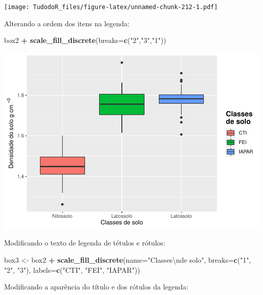 \documentclass[
]{book}
\newenvironment{Shaded}{\begin{snugshade}}{\end{snugshade}}
\newcommand{\CharTok}[1]{\textcolor[rgb]{0.31,0.60,0.02}{#1}}
\newcommand{\DataTypeTok}[1]{\textcolor[rgb]{0.13,0.29,0.53}{#1}}
\newcommand{\KeywordTok}[1]{\textcolor[rgb]{0.13,0.29,0.53}{\textbf{#1}}}
\newcommand{\NormalTok}[1]{#1}
\newcommand{\OperatorTok}[1]{\textcolor[rgb]{0.81,0.36,0.00}{\textbf{#1}}}
\newcommand{\StringTok}[1]{\textcolor[rgb]{0.31,0.60,0.02}{#1}}
\begin{document}
\texttt{[image: TudodoR\_files/figure-latex/unnamed-chunk-212-1.pdf]}

Alterando a ordem dos itens na legenda:

\begin{Shaded}
\begin{Highlighting}[]
\NormalTok{box2 }\OperatorTok{+}\StringTok{ }\KeywordTok{scale_fill_discrete}\NormalTok{(}\DataTypeTok{breaks=}\KeywordTok{c}\NormalTok{(}\StringTok{"2"}\NormalTok{,}\StringTok{"3"}\NormalTok{,}\StringTok{"1"}\NormalTok{))}
\end{Highlighting}
\end{Shaded}

\includegraphics{TudodoR_files/figure-latex/unnamed-chunk-213-1.pdf}

Modificando o texto de legenda de tétulos e rótulos:

\begin{Shaded}
\begin{Highlighting}[]
\NormalTok{box3 <-}\StringTok{ }\NormalTok{box2 }\OperatorTok{+}
\StringTok{        }\KeywordTok{scale_fill_discrete}\NormalTok{(}\DataTypeTok{name=}\StringTok{"Classes}\CharTok{\textbackslash{}n}\StringTok{de solo"}\NormalTok{,}
                          \DataTypeTok{breaks=}\KeywordTok{c}\NormalTok{(}\StringTok{"1"}\NormalTok{, }\StringTok{"2"}\NormalTok{, }\StringTok{"3"}\NormalTok{),}
                          \DataTypeTok{labels=}\KeywordTok{c}\NormalTok{(}\StringTok{"CTI"}\NormalTok{, }\StringTok{"FEI"}\NormalTok{, }\StringTok{"IAPAR"}\NormalTok{))}
\end{Highlighting}
\end{Shaded}

Modificando a aparência do título e dos rótulos da legenda:
\end{document}
